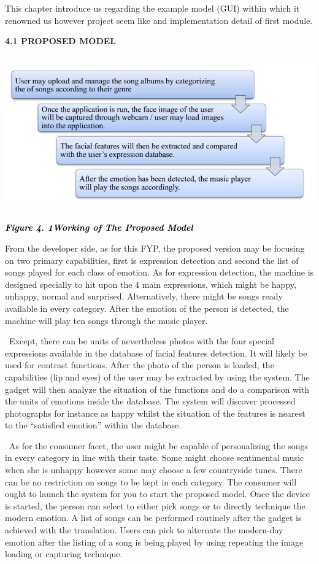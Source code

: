 \documentclass[a4paper]{article}
\begin{document}
This chapter introduce us regarding the example model (GUI) within which it renowned us however project seem like and
implementation detail of first module. 

{\bfseries
\hypertarget{44sinio}{}4.1 PROPOSED MODEL}

 \includegraphics[width=6.2681in,height=2.6252in]{rahulop-img006.jpg} 

{\centering
\hypertarget{2jxsxqh}{}\textbf{\textit{\textcolor{black}{Figure 4. 1Working of The Proposed Model}}}
\par}


\bigskip

From the developer side, as for this FYP, the proposed version may be focusing on two primary capabilities, first is
expression detection and second the list of songs played for each class of emotion. As for expression detection, the
machine is designed specially to hit upon the 4 main expressions, which might be happy, unhappy, normal and surprised.
Alternatively, there might be songs ready available in every category. After the emotion of the person is detected, the
machine will play ten songs through the music player. 

\ Except, there can be units of nevertheless photos with the four special expressions available in the database of
facial features detection. It will likely be used for contrast functions. After the photo of the person is loaded, the
capabilities (lip and eyes) of the user may be extracted by using the system. The gadget will then analyze the
situation of the functions and do a comparison with the units of emotions inside the database. The system will discover
processed photographs for instance as happy whilst the situation of the features is nearest to the ``satisfied
emotion'' within the database. 

\ As for the consumer facet, the user might be capable of personalizing the songs in every category in line with their
taste. Some might choose sentimental music when she is unhappy however some may choose a few countryside tunes. There
can be no restriction on songs to be kept in each category. The consumer will ought to launch the system for you to
start the proposed model. Once the device is started, the person can select to either pick songs or to directly
technique the modern emotion. A list of songs can be performed routinely after the gadget is achieved with the
translation. Users can pick to alternate the modern-day emotion after the listing of a song is being played by using
repeating the image loading or capturing technique. 
\end{document}
